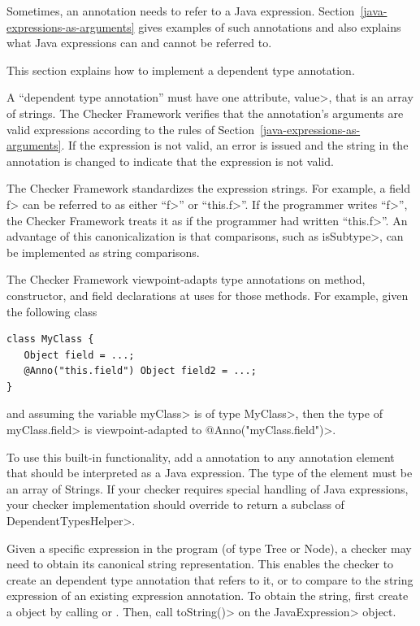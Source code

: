 
Sometimes, an annotation needs to refer to a Java expression.
Section~\ref{java-expressions-as-arguments} gives examples of such
annotations and also explains what Java expressions can and cannot be
referred to.

This section explains how to implement a dependent type annotation.

A ``dependent type annotation''
must have one attribute, \<value>, that is an
array of strings.  The Checker Framework verifies that the annotation's
arguments are valid expressions according to the rules of
Section~\ref{java-expressions-as-arguments}.  If
the expression is not valid, an error is issued and the string in the
annotation is changed to indicate that the expression is not valid.

The Checker Framework standardizes the expression strings.  For example, a
field \<f> can be referred to as either ``\<f>'' or ``\<this.f>''.  If the
programmer writes ``\<f>'', the Checker Framework treats it
as if the programmer had written ``\<this.f>''.
An advantage of this canonicalization is
that comparisons, such as \<isSubtype>, can be implemented as string comparisons.

The Checker Framework viewpoint-adapts type annotations on method, constructor,
and field declarations at uses for those methods.  For example, given the
following class

\begin{Verbatim}
class MyClass {
   Object field = ...;
   @Anno("this.field") Object field2 = ...;
}
\end{Verbatim}
and assuming the variable \<myClass> is of type \<MyClass>, then the type of
\<myClass.field> is viewpoint-adapted to \<@Anno("myClass.field")>.

To use this built-in functionality, add a  annotation
to any annotation element that should be interpreted as a Java expression.  The type of the
element must be an array of Strings.  If your checker requires special handling of Java expressions,
your checker implementation should override
to return a subclass of \<DependentTypesHelper>.

Given a specific expression in the program (of type Tree or Node), a
checker may need to obtain its canonical string representation.  This
enables the checker to create an dependent type annotation that refers to
it, or to compare to the string expression of an existing expression
annotation.
To obtain the string, first create a
 object by calling
 or
.
Then, call \<toString()> on the \<JavaExpression> object.


